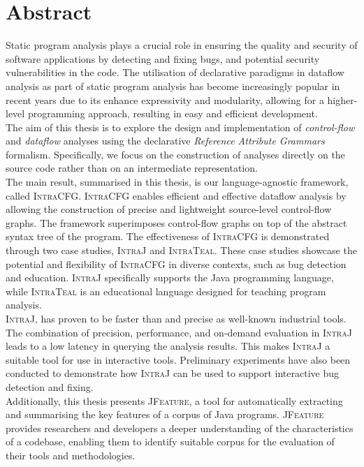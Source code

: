 \chapter{Abstract}


Static program analysis plays a crucial role in ensuring the quality and security of
software applications by detecting and fixing bugs,
and potential security vulnerabilities in the code. The utilisation of declarative
paradigms in dataflow analysis as part of static program analysis has become 
increasingly popular in recent years due to its enhance expressivity 
and modularity, allowing for a higher-level programming approach, resulting in
easy and efficient development.\\[5pt]

The aim of this thesis is to explore the design and implementation of \emph{control-flow} and 
\emph{dataflow} analyses using the declarative \emph{Reference Attribute Grammars} formalism.
Specifically, we focus on the construction of analyses directly on the source code
rather than on an intermediate representation.\\[5pt]

The main result, summarised in this thesis, is our language-agnostic framework, called \textsc{IntraCFG}.
\textsc{IntraCFG} enables efficient and effective dataflow analysis by allowing the construction of precise and
lightweight source-level control-flow graphs. The framework superimposes control-flow
graphs on top of the abstract syntax tree of the program. 
The effectiveness of \textsc{IntraCFG} is demonstrated through two case studies, 
\textsc{IntraJ} and \textsc{IntraTeal}. These case studies showcase the potential and 
flexibility of \textsc{IntraCFG} in diverse contexts, such as bug detection and education. 
\textsc{IntraJ} specifically supports the Java programming language, while 
\textsc{IntraTeal} is an educational language designed for teaching program analysis.\\[5pt]

\textsc{IntraJ}, has proven to be faster than and precise as well-known
industrial tools. 
The combination of precision, performance, and on-demand evaluation in \textsc{IntraJ} 
leads to a low latency in querying the analysis results. This makes \textsc{IntraJ} a
suitable tool for use in interactive tools. Preliminary experiments have also 
been conducted to demonstrate how \textsc{IntraJ} can be used to support interactive
bug detection and fixing.\\[5pt]

Additionally, this thesis presents \textsc{JFeature}, a tool for automatically extracting
and summarising the key features of a corpus of Java programs. \textsc{JFeature} provides 
researchers and developers a deeper understanding of the characteristics of 
a codebase, enabling them to identify suitable corpus for the evaluation of their 
tools and methodologies.
